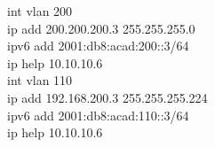 \documentclass[a4paper, 12pt]{article}
\begin{document}
{\hspace*{2cm}int vlan 200\\
\hspace*{2cm}ip add 200.200.200.3 255.255.255.0\\
\hspace*{2cm}ipv6 add 2001:db8:acad:200::3/64\\
\hspace*{2cm}ip help 10.10.10.6\\
\hspace*{2cm}int vlan 110\\
\hspace*{2cm}ip add 192.168.200.3 255.255.255.224\\
\hspace*{2cm}ipv6 add 2001:db8:acad:110::3/64\\
\hspace*{2cm}ip help 10.10.10.6\\
}
\end{document}
